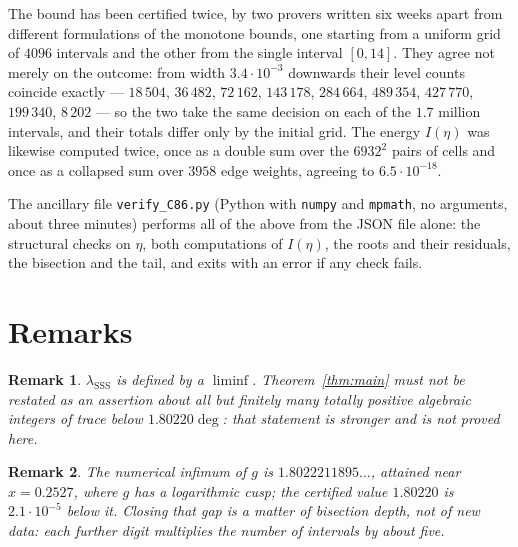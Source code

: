 \documentclass[11pt,a4paper]{article}
\newtheorem{remark}{Remark}
\newcommand{\lsss}{\lambda_{\mathrm{SSS}}}
\begin{document}
The bound has been certified twice, by two provers written six weeks apart from
different formulations of the monotone bounds, one starting from a uniform grid
of $4096$ intervals and the other from the single interval $[0,14]$. They agree
not merely on the outcome: from width $3.4\cdot10^{-3}$ downwards their level
counts coincide exactly --- $18\,504$, $36\,482$, $72\,162$, $143\,178$,
$284\,664$, $489\,354$, $427\,770$, $199\,340$, $8\,202$ --- so the two take
the same decision on each of the $1.7$ million intervals, and their totals
differ only by the initial grid. The energy $I(\eta)$ was likewise computed twice,
once as a double sum over the $6932^2$ pairs of cells and once as a collapsed sum
over $3958$ edge weights, agreeing to $6.5\cdot10^{-18}$.

The ancillary file \texttt{verify\_C86.py} (Python with \texttt{numpy} and
\texttt{mpmath}, no arguments, about three minutes) performs all of the above
from the JSON file alone: the structural checks on $\eta$, both computations of
$I(\eta)$, the roots and their residuals, the bisection and the tail, and exits
with an error if any check fails.

\section{Remarks}

\begin{remark}
$\lsss$ is defined by a $\liminf$. Theorem~\ref{thm:main} must not be restated
as an assertion about all but finitely many totally positive algebraic integers
of trace below $1.80220\deg$: that statement is stronger and is not proved here.
\end{remark}

\begin{remark}
The numerical infimum of $g$ is $1.8022211895\ldots$, attained near
$x=0.2527$, where $g$ has a logarithmic cusp; the certified value $1.80220$ is
$2.1\cdot10^{-5}$ below it. Closing that gap is a matter of bisection depth, not
of new data: each further digit multiplies the number of intervals by about
five.
\end{remark}
\end{document}
